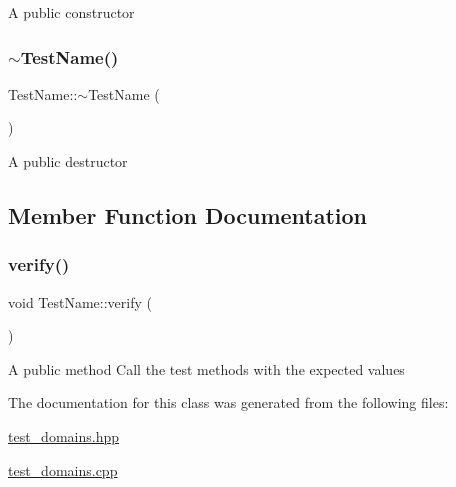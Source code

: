 A public constructor \mbox{\label{class_test_name_afc5241e6c7d586d2bc8f4d56e86431e8}} 
\subsubsection{\texorpdfstring{$\sim$\+Test\+Name()}{~TestName()}}
{\footnotesize\ttfamily Test\+Name\+::$\sim$\+Test\+Name (\begin{DoxyParamCaption}{ }\end{DoxyParamCaption})}

A public destructor 

\subsection{Member Function Documentation}
\mbox{\label{class_test_name_a578481758db2b6506d86ea8208208cfe}} 
\subsubsection{\texorpdfstring{verify()}{verify()}}
{\footnotesize\ttfamily void Test\+Name\+::verify (\begin{DoxyParamCaption}{ }\end{DoxyParamCaption})}

A public method Call the test methods with the expected values 

The documentation for this class was generated from the following files\+:\begin{DoxyCompactItemize}
\item 
\hyperlink{test__domains_8hpp}{test\+\_\+domains.\+hpp}\item 
\hyperlink{test__domains_8cpp}{test\+\_\+domains.\+cpp}\end{DoxyCompactItemize}
